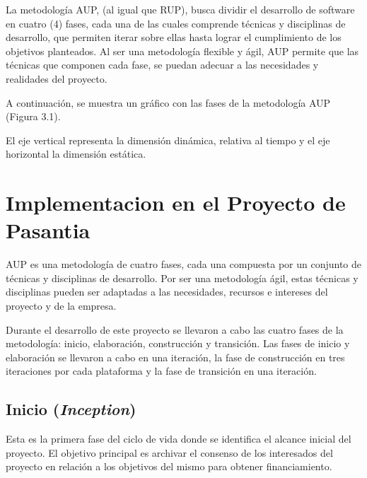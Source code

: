 La metodología AUP, (al igual que RUP), busca dividir el desarrollo
de software en cuatro (4) fases, cada una de las cuales comprende
técnicas y disciplinas de desarrollo, que permiten iterar sobre ellas
hasta lograr el cumplimiento de los objetivos planteados. Al ser una
metodología flexible y ágil, AUP permite que las técnicas que componen
cada fase, se puedan adecuar a las necesidades y realidades del proyecto. 

A continuación, se muestra un gráfico con las fases de la metodología
AUP (Figura 3.1).

\begin{center}
\begin{figure}[h]
\centering{}%
\end{figure}

\par\end{center}

El eje vertical representa la dimensión dinámica, relativa al tiempo
y el eje horizontal la dimensión estática.


\section{Implementacion en el Proyecto de Pasantia}

AUP es una metodología de cuatro fases, cada una compuesta por un
conjunto de técnicas y disciplinas de desarrollo. Por ser una metodología
ágil, estas técnicas y disciplinas pueden ser adaptadas a las necesidades,
recursos e intereses del proyecto y de la empresa.

Durante el desarrollo de este proyecto se llevaron a cabo las cuatro
fases de la metodología: inicio, elaboración, construcción y transición.
Las fases de inicio y elaboración se llevaron a cabo en una iteración,
la fase de construcción en tres iteraciones por cada plataforma y
la fase de transición en una iteración. 


\subsection{Inicio (\textit{Inception})}

Esta es la primera fase del ciclo de vida donde se identifica el alcance
inicial del proyecto. El objetivo principal es archivar el consenso
de los interesados del proyecto en relación a los objetivos del mismo
para obtener financiamiento. \cite{Cap3.AUPFases}

